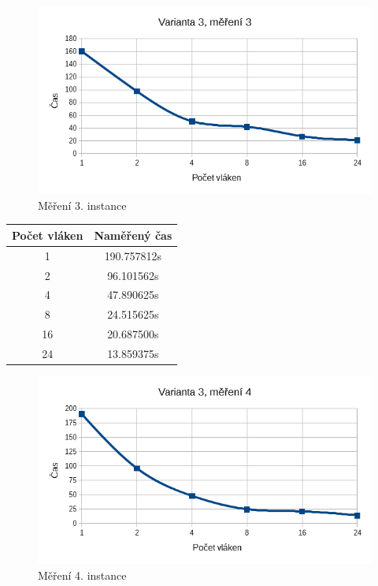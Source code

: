 \documentclass[12pt]{article}
\begin{document}
\begin{figure}[H]
  \begin{center}
      \includegraphics[width=12cm]{images/ssef3.png}	
    \caption{Měření 3. instance} 
  \end{center}
\end{figure}
%
%
\begin{center}
\begin{tabular}{ c | c }
\textbf{Počet vláken} & \textbf{Naměřený čas} \\ \hline \hline 
1 & 190.757812s \\ \hline
2 & 96.101562s \\ \hline
4 & 47.890625s \\ \hline
8 & 24.515625s \\ \hline
16 & 20.687500s \\ \hline
24 & 13.859375s \\ \hline
\end{tabular}
\end{center}

\begin{figure}[H]
  \begin{center}
      \includegraphics[width=12cm]{images/ssef4.png}	
    \caption{Měření 4. instance} 
  \end{center}
\end{figure}
\end{document}
